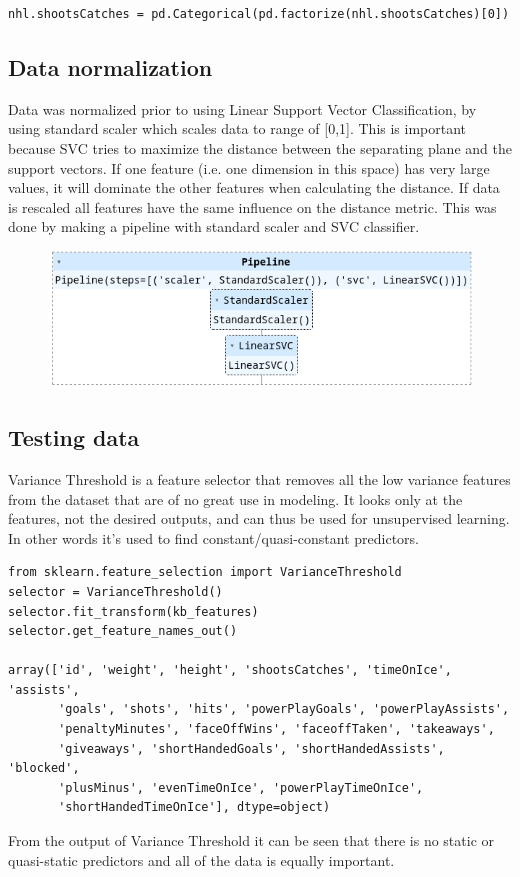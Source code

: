 \begin{verbatim}
nhl.shootsCatches = pd.Categorical(pd.factorize(nhl.shootsCatches)[0])
\end{verbatim}
			
	\subsection{Data normalization}
	Data was normalized prior to using Linear Support Vector Classification, by using standard scaler which scales data to range of [0,1]. This is important because SVC tries to maximize the distance between the separating plane and the support vectors. If one feature (i.e. one dimension in this space) has very large values, it will dominate the other features when calculating the distance. If data is rescaled all features have the same influence on the distance metric. This was done by making a pipeline with standard scaler and SVC classifier. 
	
	 \begin{figure}[H]
        \includegraphics[width=\textwidth]{pipeline}
    \end{figure}
			
	\subsection{Testing data}
	Variance Threshold is a feature selector that removes all the low variance features from the dataset that are of no great use in modeling. It looks only at the features, not the desired outputs, and can thus be used for unsupervised learning. In other words it's used to find constant/quasi-constant predictors.
	
\begin{verbatim}
from sklearn.feature_selection import VarianceThreshold
selector = VarianceThreshold()
selector.fit_transform(kb_features)
selector.get_feature_names_out()

array(['id', 'weight', 'height', 'shootsCatches', 'timeOnIce', 'assists',
       'goals', 'shots', 'hits', 'powerPlayGoals', 'powerPlayAssists',
       'penaltyMinutes', 'faceOffWins', 'faceoffTaken', 'takeaways',
       'giveaways', 'shortHandedGoals', 'shortHandedAssists', 'blocked',
       'plusMinus', 'evenTimeOnIce', 'powerPlayTimeOnIce',
       'shortHandedTimeOnIce'], dtype=object)
\end{verbatim}
	From the output of Variance Threshold it can be seen that there is no static or quasi-static predictors and all of the data is equally important.
	
